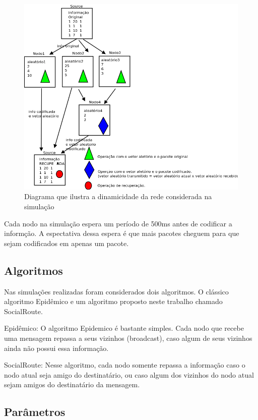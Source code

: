 \begin{figure}[ht]
\centering
\includegraphics[width=.9\textwidth]{img/diagramas/netCodingDiagram.png}
\caption{Diagrama que ilustra a dinamicidade da rede considerada na
simulação}
\label{figNetcodingDiagram}
\end{figure}

Cada nodo na simulação espera um período de 500ms antes de codificar a
informção. A espectativa dessa espera é que mais pacotes cheguem para
que sejam codificados em apenas um pacote.


\subsection{Algoritmos}\label{algoritmos}

Nas simulações realizadas foram considerados dois algoritmos. O clássico
algoritmo Epidêmico e um algoritmo proposto neste trabalho chamado
SocialRoute. 

Epidêmico: O algoritmo Epidemico é bastante simples. Cada nodo que
recebe uma mensagem repassa a seus vizinhos (broadcast), caso algum de
seus vizinhos ainda não possui essa informação. 

SocialRoute: Nesse algoritmo, cada nodo somente repassa a informação
caso o nodo atual seja amigo do destinatário, ou caso algum dos vizinhos
do nodo atual sejam amigos do destinatário da mensagem.

\subsection{Parâmetros}

